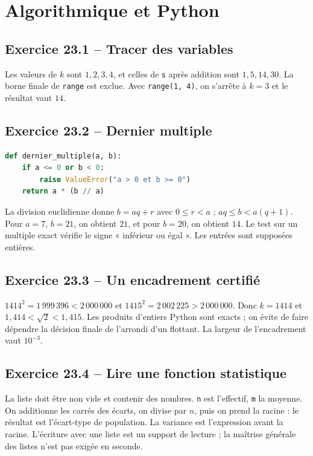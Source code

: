 \chapter{Algorithmique et Python}
\section*{Exercice 23.1 -- Tracer des variables}
Les valeurs de $k$ sont $1,2,3,4$, et celles de \texttt{s} après addition sont $1,5,14,30$. La borne finale de \texttt{range} est exclue. Avec \texttt{range(1, 4)}, on s'arrête à $k=3$ et le résultat vaut $14$.

\section*{Exercice 23.2 -- Dernier multiple}
\begin{lstlisting}[language=Python]
def dernier_multiple(a, b):
    if a <= 0 or b < 0:
        raise ValueError("a > 0 et b >= 0")
    return a * (b // a)
\end{lstlisting}
La division euclidienne donne $b=aq+r$ avec $0\le r<a$ ; $aq\le b<a(q+1)$. Pour $a=7$, $b=21$, on obtient $21$, et pour $b=20$, on obtient $14$. Le test sur un multiple exact vérifie le signe « inférieur ou égal ». Les entrées sont supposées entières.

\section*{Exercice 23.3 -- Un encadrement certifié}
$1414^2=1\,999\,396<2\,000\,000$ et $1415^2=2\,002\,225>2\,000\,000$. Donc $k=1414$ et $1{,}414<\sqrt2<1{,}415$. Les produits d'entiers Python sont exacts ; on évite de faire dépendre la décision finale de l'arrondi d'un flottant. La largeur de l'encadrement vaut $10^{-3}$.

\section*{Exercice 23.4 -- Lire une fonction statistique}
La liste doit être non vide et contenir des nombres. \texttt{n} est l'effectif, \texttt{m} la moyenne. On additionne les carrés des écarts, on divise par $n$, puis on prend la racine : le résultat est l'écart-type de population. La variance est l'expression avant la racine. L'écriture avec une liste est un support de lecture ; la maîtrise générale des listes n'est pas exigée en seconde.

